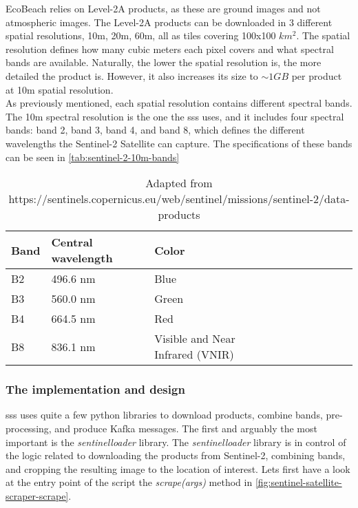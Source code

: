 EcoBeach relies on Level-2A products, as these are ground images and not atmospheric images. The Level-2A products can be downloaded in 3 different spatial resolutions, 10m, 20m, 60m, all as tiles covering 100x100 $km^2$. The spatial resolution defines how many cubic meters each pixel covers and what spectral bands are available. Naturally, the lower the spatial resolution is, the more detailed the product is. However, it also increases its size to $\sim 1GB$ per product at 10m spatial resolution. \\

As previously mentioned, each spatial resolution contains different spectral bands. The 10m spectral resolution is the one the \acrshort{sss} uses, and it includes four spectral bands: band 2, band 3, band 4, and band 8, which defines the different wavelengths the Sentinel-2 Satellite can capture. The specifications of these bands can be seen in \autoref{tab:sentinel-2-10m-bands}

\begin{table}[h!]
    \centering
    \begin{tabular}{| p{0.1\linewidth} | p{0.3\linewidth} | p{0.3\linewidth} | p{0.3\linewidth} |}
        \hline
        \textbf{Band} & \textbf{Central wavelength} & \textbf{Color}                   \\ \hline
        B2            & 496.6 nm                    & Blue                             \\ \hline
        B3            & 560.0 nm                    & Green                            \\ \hline
        B4            & 664.5 nm                    & Red                              \\ \hline
        B8            & 836.1 nm                    & Visible and Near Infrared (VNIR) \\ \hline
    \end{tabular}
    \caption{Adapted from https://sentinels.copernicus.eu/web/sentinel/missions/sentinel-2/data-products}
    \label{tab:sentinel-2-10m-bands}
\end{table}

\subsubsection{The implementation and design}

\acrshort{sss} uses quite a few python libraries to download products, combine bands, pre-processing, and produce Kafka messages. The first and arguably the most important is the \emph{sentinelloader} library. The \emph{sentinelloader} library is in control of the logic related to downloading the products from Sentinel-2, combining bands, and cropping the resulting image to the location of interest. Lets first have a look at the entry point of the script the \emph{scrape(args)} method in \autoref{fig:sentinel-satellite-scraper-scrape}.

